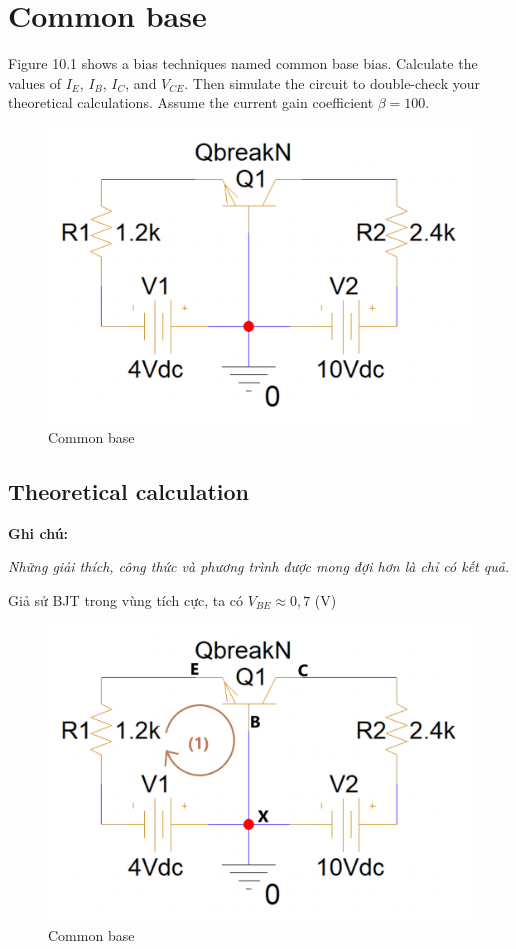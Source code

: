 \section{Common base}
Figure 10.1 shows a bias techniques named common base bias.
Calculate the values of \(I_E\), \(I_B\), \(I_C\), and \(V_{CE}\). Then simulate the circuit to double-check your theoretical calculations.
Assume the current gain coefficient \(\beta = 100\).

\begin{figure}[ht]
    \centering
    \includegraphics[scale=0.3]{graphics/ex10/f1.png}
    \caption{Common base}
\end{figure}
\subsection{Theoretical calculation}
\textbf{Ghi chú:}

\textit{Những giải thích, công thức và phương trình được mong đợi hơn là chỉ có kết quả.}

Giả sử BJT trong vùng tích cực, ta có \(V_{BE} \approx 0,7\) (V)

\begin{figure}[ht]
    \centering
    \includegraphics[scale=0.3]{graphics/ex10/f2.png}
    \caption{Common base}
\end{figure}

